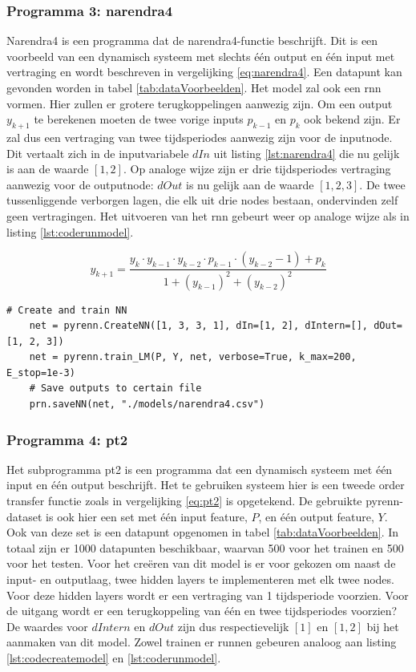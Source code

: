 		\subsubsection{Programma 3: narendra4}
		Narendra4 is een programma dat de narendra4-functie\cite{narendra4} beschrijft. Dit is een voorbeeld van een dynamisch systeem met slechts \'e\'en output en \'e\'en input met vertraging en wordt beschreven in vergelijking \ref{eq:narendra4}. Een datapunt kan gevonden worden in tabel \ref{tab:dataVoorbeelden}. Het model zal ook een \gls{rnn} vormen. Hier zullen er grotere terugkoppelingen aanwezig zijn. Om een output $y_{k+1}$ te berekenen moeten de twee vorige inputs $p_{k-1}$ en $p_{k}$ ook bekend zijn. Er zal dus een vertraging van twee tijdsperiodes aanwezig zijn voor de inputnode. Dit vertaalt zich in de inputvariabele $dIn$ uit listing \ref{lst:narendra4} die nu gelijk is aan de waarde $[1,2]$. Op analoge wijze zijn er drie tijdsperiodes vertraging aanwezig voor de outputnode: $dOut$ is nu gelijk aan de waarde $[1,2,3]$. De twee tussenliggende verborgen lagen, die elk uit drie nodes bestaan, ondervinden zelf geen vertragingen. Het uitvoeren van het \gls{rnn} gebeurt weer op analoge wijze als in listing \ref{lst:coderunmodel}.
		
		\begin{equation}\label{eq:narendra4}
			y_{k+1} =\frac{ y_k \cdot y_{k-1} \cdot y_{k-2}\cdot p_{k-1}\cdot(y_{k-2}-1	)+ p_k} {1+(y_{k-1})^2+(y_{k-2})^2}	
		\end{equation}
		
		\begin{lstlisting}[caption={Cre\"eren en trainen van pyrenn-model voor narendra4.}, captionpos=b,label={lst:narendra4}]
	# Create and train NN
	net = pyrenn.CreateNN([1, 3, 3, 1], dIn=[1, 2], dIntern=[], dOut=[1, 2, 3])
	net = pyrenn.train_LM(P, Y, net, verbose=True, k_max=200, E_stop=1e-3)
	# Save outputs to certain file
	prn.saveNN(net, "./models/narendra4.csv")
		\end{lstlisting}
		
		\subsubsection{Programma 4: pt2}
		Het subprogramma pt2 is een programma dat een dynamisch systeem met \'e\'en input en \'e\'en output beschrijft. Het te gebruiken systeem hier is een tweede order transfer functie zoals in vergelijking \ref{eq:pt2} is opgetekend. De gebruikte pyrenn-dataset is ook hier een set met \'e\'en input feature, $P$, en \'e\'en output feature, $Y$. Ook van deze set is een datapunt opgenomen in tabel \ref{tab:dataVoorbeelden}. In totaal zijn er 1000 datapunten beschikbaar, waarvan 500 voor het trainen en 500 voor het testen. Voor het cre\"eren van dit model is er voor gekozen om naast de input- en outputlaag, twee hidden layers te implementeren met elk twee nodes. Voor deze hidden layers wordt er een vertraging van 1 tijdsperiode voorzien. Voor de uitgang wordt er een terugkoppeling van \'e\'en en twee tijdsperiodes voorzien? De waardes voor $dIntern$ en $dOut$ zijn dus respectievelijk $[1]$ en $[1,2]$ bij het aanmaken van dit model. Zowel trainen er runnen gebeuren analoog aan listing  \ref{lst:codecreatemodel} en \ref{lst:coderunmodel}.
		
